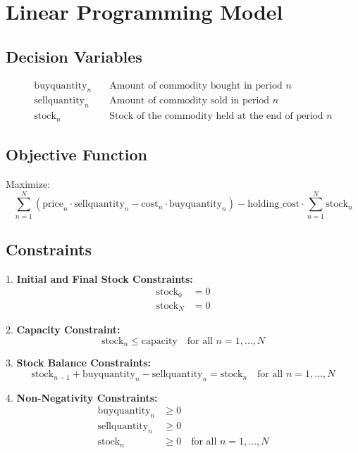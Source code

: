 \documentclass{article}
\begin{document}
\section*{Linear Programming Model}

\subsection*{Decision Variables}
\begin{align*}
\text{buyquantity}_n & \quad \text{Amount of commodity bought in period } n \\
\text{sellquantity}_n & \quad \text{Amount of commodity sold in period } n \\
\text{stock}_n & \quad \text{Stock of the commodity held at the end of period } n
\end{align*}

\subsection*{Objective Function}
Maximize:
\begin{equation*}
\sum_{n=1}^{N} \left( \text{price}_n \cdot \text{sellquantity}_n - \text{cost}_n \cdot \text{buyquantity}_n \right) - \text{holding\_cost} \cdot \sum_{n=1}^{N} \text{stock}_n
\end{equation*}

\subsection*{Constraints}
1. \textbf{Initial and Final Stock Constraints:}
\begin{align*}
\text{stock}_0 &= 0 \\
\text{stock}_N &= 0
\end{align*}

2. \textbf{Capacity Constraint:}
\begin{equation*}
\text{stock}_n \leq \text{capacity} \quad \text{for all } n = 1,\ldots,N
\end{equation*}

3. \textbf{Stock Balance Constraints:}
\begin{equation*}
\text{stock}_{n-1} + \text{buyquantity}_n - \text{sellquantity}_n = \text{stock}_n \quad \text{for all } n = 1,\ldots,N
\end{equation*}

4. \textbf{Non-Negativity Constraints:}
\begin{align*}
\text{buyquantity}_n &\geq 0 \\
\text{sellquantity}_n &\geq 0 \\
\text{stock}_n &\geq 0 \quad \text{for all } n = 1,\ldots,N
\end{align*}
\end{document}
